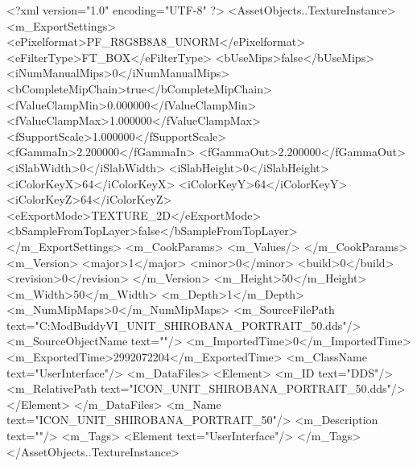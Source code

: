 <?xml version="1.0" encoding="UTF-8" ?>
<AssetObjects..TextureInstance>
	<m_ExportSettings>
		<ePixelformat>PF_R8G8B8A8_UNORM</ePixelformat>
		<eFilterType>FT_BOX</eFilterType>
		<bUseMips>false</bUseMips>
		<iNumManualMips>0</iNumManualMips>
		<bCompleteMipChain>true</bCompleteMipChain>
		<fValueClampMin>0.000000</fValueClampMin>
		<fValueClampMax>1.000000</fValueClampMax>
		<fSupportScale>1.000000</fSupportScale>
		<fGammaIn>2.200000</fGammaIn>
		<fGammaOut>2.200000</fGammaOut>
		<iSlabWidth>0</iSlabWidth>
		<iSlabHeight>0</iSlabHeight>
		<iColorKeyX>64</iColorKeyX>
		<iColorKeyY>64</iColorKeyY>
		<iColorKeyZ>64</iColorKeyZ>
		<eExportMode>TEXTURE_2D</eExportMode>
		<bSampleFromTopLayer>false</bSampleFromTopLayer>
	</m_ExportSettings>
	<m_CookParams>
		<m_Values/>
	</m_CookParams>
	<m_Version>
		<major>1</major>
		<minor>0</minor>
		<build>0</build>
		<revision>0</revision>
	</m_Version>
	<m_Height>50</m_Height>
	<m_Width>50</m_Width>
	<m_Depth>1</m_Depth>
	<m_NumMipMaps>0</m_NumMipMaps>
	<m_SourceFilePath text="C:\Users\asus\Documents\Firaxis ModBuddy\Civilization VI\temppic\ICON_UNIT_SHIROBANA_PORTRAIT_50.dds"/>
	<m_SourceObjectName text=""/>
	<m_ImportedTime>0</m_ImportedTime>
	<m_ExportedTime>2992072204</m_ExportedTime>
	<m_ClassName text="UserInterface"/>
	<m_DataFiles>
		<Element>
			<m_ID text="DDS"/>
			<m_RelativePath text="ICON_UNIT_SHIROBANA_PORTRAIT_50.dds"/>
		</Element>
	</m_DataFiles>
	<m_Name text="ICON_UNIT_SHIROBANA_PORTRAIT_50"/>
	<m_Description text=""/>
	<m_Tags>
		<Element text="UserInterface"/>
	</m_Tags>
</AssetObjects..TextureInstance>

